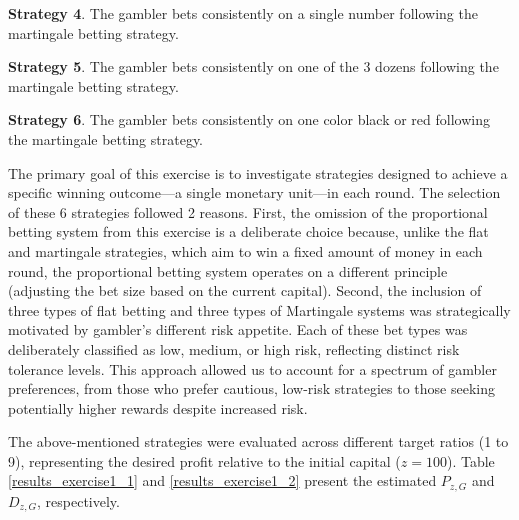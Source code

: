 \documentclass[11pt,twoside]{article}
\numberwithin{Theorem}{section}
\numberwithin{Definition}{section}
\numberwithin{Lemma}{section}
\numberwithin{Algorithm}{section}
\numberwithin{equation}{section}
\begin{document}
\begin{tcolorbox}[colback=gray!10,boxrule=0.25pt]
\textbf{Strategy 4}. The gambler bets consistently on a single number following the martingale betting strategy.
\end{tcolorbox}

\begin{tcolorbox}[colback=gray!10,boxrule=0.25pt]
\textbf{Strategy 5}. The gambler bets consistently on one of the 3 dozens following the martingale betting strategy.
\end{tcolorbox}

\begin{tcolorbox}[colback=gray!10,boxrule=0.25pt]
\textbf{Strategy 6}. The gambler bets consistently on one color black or red following the martingale betting strategy.
\end{tcolorbox}

The primary goal of this exercise is to investigate strategies designed to achieve a specific winning outcome—a single monetary unit—in each round. The selection of these 6 strategies followed 2 reasons. First, the omission of the proportional betting system from this exercise is a deliberate choice because, unlike the flat and martingale strategies, which aim to win a fixed amount of money in each round, the proportional betting system operates on a different principle (adjusting the bet size based on the current capital). Second, the inclusion of three types of flat betting and three types of Martingale systems was strategically motivated by gambler's different risk appetite. Each of these bet types was deliberately classified as low, medium, or high risk, reflecting distinct risk tolerance levels. This approach allowed us to account for a spectrum of gambler preferences, from those who prefer cautious, low-risk strategies to those seeking potentially higher rewards despite increased risk.

The above-mentioned strategies were evaluated across different target ratios (1 to 9), representing the desired profit relative to the initial capital ($z=100$). Table \ref{results_exercise1_1} and \ref{results_exercise1_2} present the estimated $P_{z,G}$ and $D_{z,G}$, respectively. 
\end{document}
